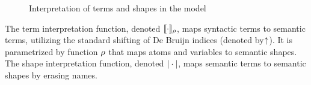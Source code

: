 \documentclass[english, mgr]{iithesis}
\begin{document}
\begin{figure}[htbp]
  \centering
  \caption{Interpretation of terms and shapes in the model}
  \label{fig:terms-shapes-interpretation}
\end{figure}
The term interpretation function, denoted $\llbracket \cdot \rrbracket_{\rho}$,
maps syntactic terms to semantic terms,
utilizing the standard shifting of De Bruijn indices (denoted by { }$\kern-3pt \uparrow$).
It is parametrized by function $\rho$ that maps atoms and variables to
semantic shapes.\\
The shape interpretation function, denoted $|\cdot|$,
maps semantic terms to semantic shapes by erasing names.
\end{document}
